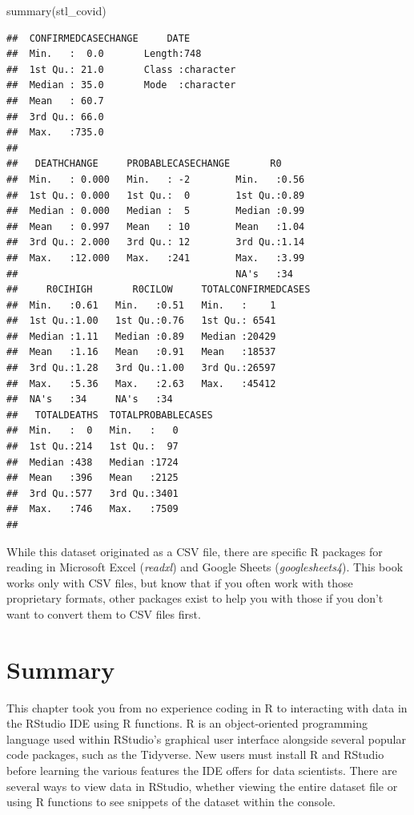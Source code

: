 \documentclass[
  krantz2]{krantz}
\makeatletter
\newenvironment{Shaded}{\begin{snugshade}}{\end{snugshade}}
\newcommand{\FunctionTok}[1]{\textcolor[rgb]{0,0,0}{#1}}
\newcommand{\NormalTok}[1]{#1}
\newenvironment{kframe}{%
\medskip{}
\setlength{\fboxsep}{.8em}
 \def\at@end@of@kframe{}%
 \ifinner\ifhmode%
  \def\at@end@of@kframe{\end{minipage}}%
  \begin{minipage}{\columnwidth}%
 \fi\fi%
 \def\FrameCommand##1{\hskip\@totalleftmargin \hskip-\fboxsep
 \colorbox{shadecolor}{##1}\hskip-\fboxsep
     \hskip-\linewidth \hskip-\@totalleftmargin \hskip\columnwidth}%
 \MakeFramed {\advance\hsize-\width
   \@totalleftmargin\z@ \linewidth\hsize
   \@setminipage}}%
 {\par\unskip\endMakeFramed%
 \at@end@of@kframe}
\renewenvironment{Shaded}{\begin{kframe}}{\end{kframe}}
\makeatother
\begin{document}
\begin{Shaded}
\begin{Highlighting}[]
\FunctionTok{summary}\NormalTok{(stl\_covid)}
\end{Highlighting}
\end{Shaded}

\begin{verbatim}
##  CONFIRMEDCASECHANGE     DATE
##  Min.   :  0.0       Length:748
##  1st Qu.: 21.0       Class :character
##  Median : 35.0       Mode  :character
##  Mean   : 60.7
##  3rd Qu.: 66.0
##  Max.   :735.0
##
##   DEATHCHANGE     PROBABLECASECHANGE       R0
##  Min.   : 0.000   Min.   : -2        Min.   :0.56
##  1st Qu.: 0.000   1st Qu.:  0        1st Qu.:0.89
##  Median : 0.000   Median :  5        Median :0.99
##  Mean   : 0.997   Mean   : 10        Mean   :1.04
##  3rd Qu.: 2.000   3rd Qu.: 12        3rd Qu.:1.14
##  Max.   :12.000   Max.   :241        Max.   :3.99
##                                      NA's   :34
##     R0CIHIGH       R0CILOW     TOTALCONFIRMEDCASES
##  Min.   :0.61   Min.   :0.51   Min.   :    1
##  1st Qu.:1.00   1st Qu.:0.76   1st Qu.: 6541
##  Median :1.11   Median :0.89   Median :20429
##  Mean   :1.16   Mean   :0.91   Mean   :18537
##  3rd Qu.:1.28   3rd Qu.:1.00   3rd Qu.:26597
##  Max.   :5.36   Max.   :2.63   Max.   :45412
##  NA's   :34     NA's   :34
##   TOTALDEATHS  TOTALPROBABLECASES
##  Min.   :  0   Min.   :   0
##  1st Qu.:214   1st Qu.:  97
##  Median :438   Median :1724
##  Mean   :396   Mean   :2125
##  3rd Qu.:577   3rd Qu.:3401
##  Max.   :746   Max.   :7509
##
\end{verbatim}

While this dataset originated as a CSV file, there are specific R packages for reading in Microsoft Excel (\emph{readxl}) and Google Sheets (\emph{googlesheets4}). This book works only with CSV files, but know that if you often work with those proprietary formats, other packages exist to help you with those if you don't want to convert them to CSV files first.

\hypertarget{rstudio-summary}{%
\section{Summary}\label{rstudio-summary}}

This chapter took you from no experience coding in R to interacting with data in the RStudio IDE using R functions. R is an object-oriented programming language used within RStudio's graphical user interface alongside several popular code packages, such as the Tidyverse. New users must install R and RStudio before learning the various features the IDE offers for data scientists. There are several ways to view data in RStudio, whether viewing the entire dataset file or using R functions to see snippets of the dataset within the console.
\end{document}

